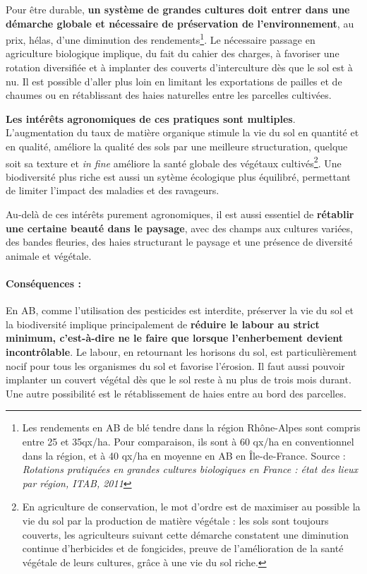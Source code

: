 \documentclass{book}
\begin{document}
Pour être durable, \textbf{un système de grandes cultures doit entrer dans une démarche globale et nécessaire de préservation de l'environnement}, au prix, hélas, d'une diminution des rendements\footnote{Les rendements en AB de blé tendre dans la région Rhône-Alpes sont compris entre 25 et 35qx/ha. Pour comparaison, ils sont à 60 qx/ha en conventionnel dans la région, et à 40 qx/ha en moyenne en AB en Île-de-France. Source : \textit{Rotations pratiquées en grandes cultures biologiques en France : état des lieux par région, ITAB, 2011}}. Le nécessaire passage en agriculture biologique implique, du fait du cahier des charges, à favoriser une rotation diversifiée et à implanter des couverts d'interculture dès que le sol est à nu. Il est possible d'aller plus loin en limitant les exportations de pailles et de chaumes ou en rétablissant des haies naturelles entre les parcelles cultivées.

\textbf{Les intérêts agronomiques de ces pratiques sont multiples}. L'augmentation du taux de matière organique stimule la vie du sol en quantité et en qualité, améliore la qualité des sols par une meilleure structuration, quelque soit sa texture et \textit{in fine} améliore la santé globale des végétaux cultivés\footnote{En agriculture de conservation, le mot d'ordre est de maximiser au possible la vie du sol par la production de matière végétale : les sols sont toujours couverts, les agriculteurs suivant cette démarche constatent une diminution continue d'herbicides et de fongicides, preuve de l'amélioration de la santé végétale de leurs cultures, grâce à une vie du sol riche.}. Une biodiversité plus riche est aussi un sytème écologique plus équilibré, permettant de limiter l'impact des maladies et des ravageurs.

Au-delà de ces intérêts purement agronomiques, il est aussi essentiel de \textbf{rétablir une certaine beauté dans le paysage}, avec des champs aux cultures variées, des bandes fleuries, des haies structurant le paysage et une présence de diversité animale et végétale.

\paragraph{Conséquences :} En AB, comme l'utilisation des pesticides est interdite, préserver la vie du sol et la biodiversité implique principalement de \textbf{réduire le labour au strict minimum, c'est-à-dire ne le faire que lorsque l'enherbement devient incontrôlable}. Le labour, en retournant les horisons du sol, est particulièrement nocif pour tous les organismes du sol et favorise l'érosion. Il faut aussi pouvoir implanter un couvert végétal dès que le sol reste à nu plus de trois mois durant. Une autre possibilité est le rétablissement de haies entre au bord des parcelles. 
\end{document}
